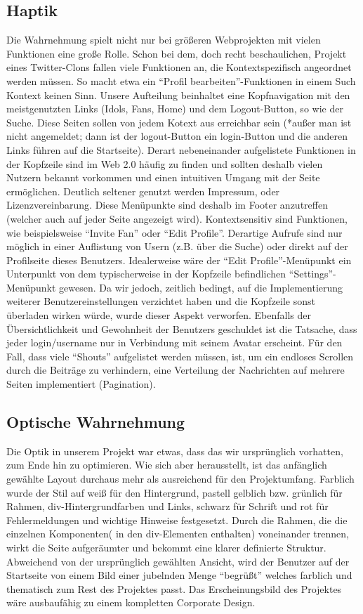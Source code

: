 \subsection*{Haptik}
Die Wahrnehmung spielt nicht nur bei größeren Webprojekten mit vielen Funktionen eine große Rolle. Schon bei dem, doch recht beschaulichen, Projekt eines Twitter-Clons fallen viele Funktionen an, die Kontextspezifisch angeordnet werden müssen. So macht etwa ein "`Profil bearbeiten"'-Funktionen in einem Such Kontext keinen Sinn. Unsere Aufteilung beinhaltet eine Kopfnavigation mit den meistgenutzten Links (Idols, Fans, Home) und dem Logout-Button, so wie der Suche. Diese Seiten sollen von jedem Kotext aus erreichbar sein (*außer man ist nicht angemeldet; dann ist der logout-Button ein login-Button und die anderen Links führen auf die Startseite). Derart nebeneinander aufgelistete Funktionen in der Kopfzeile sind im Web 2.0 häufig zu finden und sollten deshalb vielen Nutzern bekannt vorkommen und einen intuitiven Umgang mit der Seite ermöglichen. Deutlich seltener genutzt werden Impressum, oder Lizenzvereinbarung. Diese Menüpunkte sind deshalb im Footer anzutreffen (welcher auch auf jeder Seite angezeigt wird). Kontextsensitiv sind Funktionen, wie beispielsweise "`Invite Fan"' oder "`Edit Profile"'. Derartige Aufrufe sind nur möglich in einer
 Auflistung von Usern (z.B. über die Suche) oder direkt auf der Profilseite dieses Benutzers. Idealerweise wäre der "`Edit Profile"'-Menüpunkt ein Unterpunkt von dem typischerweise in der Kopfzeile befindlichen "`Settings"'-Menüpunkt  gewesen. Da wir jedoch, zeitlich bedingt, auf die Implementierung weiterer Benutzereinstellungen verzichtet haben und die Kopfzeile sonst überladen wirken würde, wurde dieser Aspekt verworfen. Ebenfalls der Übersichtlichkeit und Gewohnheit der Benutzers geschuldet ist die Tatsache, dass jeder login/username nur in Verbindung mit seinem Avatar erscheint. Für den Fall, dass viele "`Shouts"' aufgelistet werden müssen, ist, um ein endloses Scrollen durch die Beiträge zu verhindern, eine Verteilung der Nachrichten auf mehrere Seiten implementiert (Pagination).  


\subsection*{Optische Wahrnehmung}
Die Optik in unserem Projekt war etwas, dass das wir ursprünglich vorhatten, zum Ende hin zu optimieren. Wie sich aber herausstellt, ist das anfänglich gewählte Layout durchaus mehr als ausreichend für den Projektumfang. Farblich wurde der Stil auf weiß für den Hintergrund, pastell gelblich bzw. grünlich für Rahmen, div-Hintergrundfarben und Links, schwarz für Schrift und rot für Fehlermeldungen und wichtige Hinweise festgesetzt. Durch die Rahmen, die die einzelnen Komponenten( in den div-Elementen enthalten) voneinander trennen, wirkt die Seite aufgeräumter und bekommt eine klarer definierte Struktur. Abweichend von der ursprünglich gewählten Ansicht, wird der Benutzer auf der Startseite von einem Bild einer jubelnden Menge "`begrüßt"' welches farblich und thematisch zum Rest des Projektes passt. Das Erscheinungsbild des Projektes wäre ausbaufähig zu einem kompletten Corporate Design.

